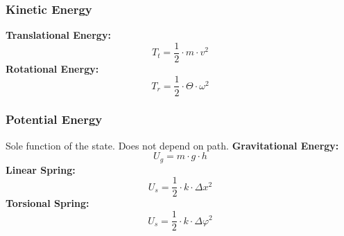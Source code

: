     \subsubsection{Kinetic Energy}
        \vspace{-1em}
        \begin{minipage}{0.69\linewidth}
            \textbf{Translational Energy:}
            $$
                T_t = \frac{1}{2} \cdot m \cdot v^2
            $$
            \textbf{Rotational Energy:}
            $$
                T_r = \frac{1}{2} \cdot \Theta \cdot \omega^2
            $$
        \end{minipage}
        \begin{minipage}{0.3\linewidth}
            \begin{center}
            \end{center}
        \end{minipage}
    \subsubsection{Potential Energy}
        Sole function of the state. Does not depend on path.
        \textbf{Gravitational Energy:}
        $$
            U_g = m \cdot g \cdot h
        $$\vspace{-0.25em}
        \textbf{Linear Spring:}\vspace{-0.25em}
        $$
            U_s = \frac{1}{2} \cdot k \cdot \Delta x^2
        $$
        \textbf{Torsional Spring:}\vspace{-0.25em}
        $$
            U_s = \frac{1}{2} \cdot k \cdot \Delta \varphi^2
        $$
